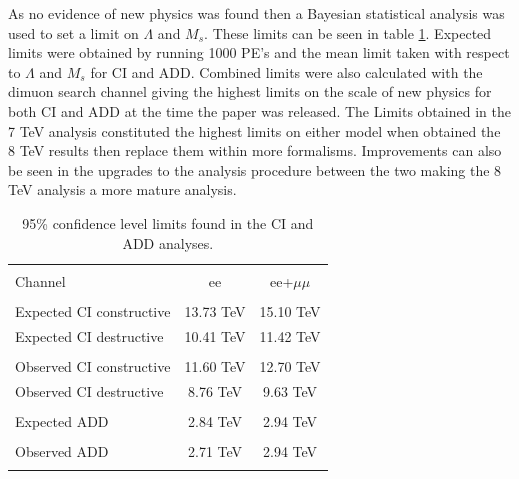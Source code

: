 	As no evidence of new physics was found then a Bayesian statistical analysis was used to set a limit on $\Lambda$ and $M_{s}$. These limits can be seen in table \ref{tab:Limits7}. Expected limits were obtained by running 1000 PE's and the mean limit taken with respect to $\Lambda$ and $M_{s}$ for CI and ADD. Combined limits were also calculated with the dimuon search channel giving the highest limits on the scale of new physics for both CI and ADD at the time the paper was released.
	The Limits obtained in the 7 TeV analysis constituted the highest limits on either model when obtained the 8 TeV results then replace them within more formalisms. Improvements can also be seen in the upgrades to the analysis procedure between the two making the 8 TeV analysis a more mature analysis. 


	\begin{table}[h!]
	\centering %
	\begin{tabular}{l cc} %
	\hline\hline \\[-2ex] %
	Channel & ee & ee+$\mu\mu$\\  [0.2ex]
	\hline  \\[-2ex] %
	Expected CI constructive & 13.73 TeV & 15.10 TeV\\ 
	Expected CI destructive & 10.41 TeV & 11.42 TeV \\ 
	\hline  \\[-2ex] %
	Observed CI constructive & 11.60 TeV & 12.70 TeV \\ 
	Observed CI destructive & 8.76 TeV & 9.63 TeV \\ 
	\hline\hline  \\[-2ex] %
	Expected ADD & 2.84 TeV & 2.94 TeV \\ 
	\hline  \\[-2ex] %
	Observed ADD & 2.71 TeV & 2.94 TeV \\ 
	\hline\hline  \\ %
	\end{tabular}
	\caption{95\% confidence level limits found in the CI and ADD analyses.} %
	\label{tab:Limits7}
	\end{table}











































